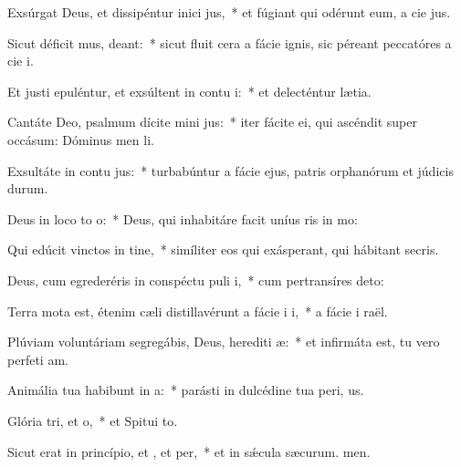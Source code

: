 \item Exsúrgat Deus, et dissipéntur inici jus,~* et fúgiant qui odérunt eum, a cie jus.
\item Sicut déficit mus, deant:~* sicut fluit cera a fácie ignis, sic péreant peccatóres a cie i.
\item Et justi epuléntur, et exsúltent in contu i:~* et delecténtur  lætia.
\item Cantáte Deo, psalmum dícite mini jus:~* iter fácite ei, qui ascéndit super occásum: Dóminus men li.
\item Exsultáte in contu jus:~* turbabúntur a fácie ejus, patris orphanórum et júdicis durum.
\item Deus in loco to o:~* Deus, qui inhabitáre facit uníus ris in mo:
\item Qui edúcit vinctos in tine,~* simíliter eos qui exásperant, qui hábitant  secris.
\item Deus, cum egrederéris in conspéctu puli i,~* cum pertransíres  deto:
\item Terra mota est, étenim cæli distillavérunt a fácie i i,~* a fácie i raël.
\item Plúviam voluntáriam segregábis, Deus, herediti æ:~* et infirmáta est, tu vero perfeti am.
\item Animália tua habibunt in a:~* parásti in dulcédine tua peri, us.
\item Glória tri, et o,~* et Spitui to.
\item Sicut erat in princípio, et , et per,~* et in sǽcula sæcurum. men.
